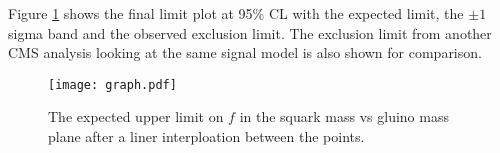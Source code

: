 Figure \ref{fig:finallimit} shows the final limit plot at 95\% CL with the
expected limit, the $\pm1$ sigma band and the observed exclusion limit. The
exclusion limit from another CMS analysis \cite{ra3} looking at the same signal 
model is also shown for comparison.

\begin{figure}
\begin{center}
\texttt{[image: graph.pdf]}
\end{center}
\caption{The expected upper limit on $f$ in the squark mass vs gluino mass plane 
after a liner interploation between the points. }
\label{fig:finallimit}
\end{figure}
